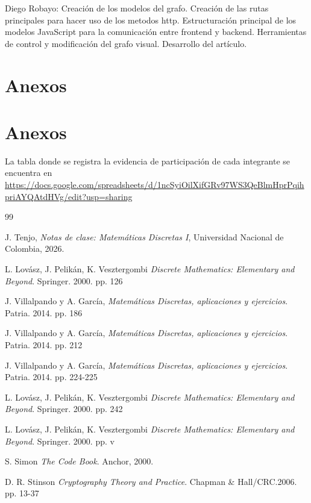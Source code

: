 \documentclass[conference]{IEEEtran}
\begin{document}
Diego Robayo: Creación de los modelos del grafo. Creación de las rutas principales para hacer uso de los metodos http. Estructuración principal de los modelos JavaScript para la comunicación entre frontend y backend. Herramientas de control y modificación del grafo visual. Desarrollo del artículo.

\section{Anexos}





\appendices

\section{Anexos}

La tabla donde se registra la evidencia de participación de cada integrante se encuentra en \url{https://docs.google.com/spreadsheets/d/1ncSyiOilXifGRv97WS3QeBlmHprPqihpriAYQAtdHVg/edit?usp=sharing}


\begin{thebibliography}{99}

J. Tenjo,
\emph{Notas de clase: Matemáticas Discretas I},
Universidad Nacional de Colombia, 2026.

L. Lovász, J. Pelikán, K. Vesztergombi
\emph{Discrete Mathematics: Elementary and Beyond}.
Springer. 2000. pp. 126

J. Villalpando y A. García,
\emph{Matemáticas Discretas, aplicaciones y ejercicios}.
Patria. 2014. pp. 186

J. Villalpando y A. García,
\emph{Matemáticas Discretas, aplicaciones y ejercicios}.
Patria. 2014. pp. 212

J. Villalpando y A. García,
\emph{Matemáticas Discretas, aplicaciones y ejercicios}.
Patria. 2014. pp. 224-225

L. Lovász, J. Pelikán, K. Vesztergombi
\emph{Discrete Mathematics: Elementary and Beyond}.
Springer. 2000. pp. 242

L. Lovász, J. Pelikán, K. Vesztergombi
\emph{Discrete Mathematics: Elementary and Beyond}.
Springer. 2000. pp. v

S. Simon
\emph{The Code Book}.
Anchor, 2000. 

D. R. Stinson
\emph{Cryptography Theory and Practice}.
Chapman \& Hall/CRC.2006. pp. 13-37 

\end{thebibliography}
\end{document}
